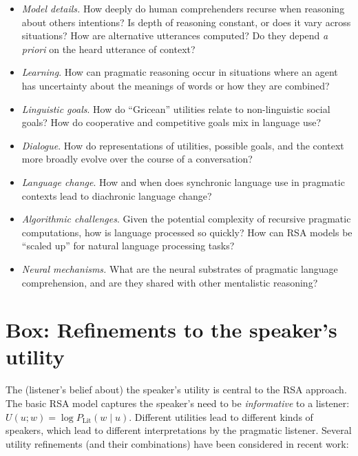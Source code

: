\documentclass[]{elsarticle}
\begin{document}
\begin{itemize}
\item \emph{Model details.} How deeply do human comprehenders recurse when
  reasoning about others intentions? Is depth of reasoning constant, or
  does it vary across situations? How are alternative utterances
  computed? Do they depend \emph{a priori} on the heard utterance of
  context?

\item \emph{Learning}. How can pragmatic reasoning occur in situations where
  an agent has uncertainty about the meanings of words or how they are
  combined?

\item \emph{Linguistic goals}. How do ``Gricean'' utilities relate to non-linguistic social goals? How do cooperative and competitive goals mix in language use?

\item \emph{Dialogue}. How do representations of utilities, possible goals,
  and the context more broadly evolve over the course of a conversation?

\item \emph{Language change}. How and when does synchronic language use in
  pragmatic contexts lead to diachronic language change?

\item \emph{Algorithmic challenges}. Given the potential complexity of
  recursive pragmatic computations, how is language processed so
  quickly? How can RSA models be ``scaled up'' for natural language
  processing tasks?

\item \emph{Neural mechanisms.} What are the neural substrates of pragmatic
  language comprehension, and are they shared with other mentalistic
  reasoning?

\end{itemize}

\section{Box: Refinements to the speaker's utility}\label{box-refinements-to-the-speakers-utility}

The (listener's belief about) the speaker's utility is central to the
RSA approach. The basic RSA model captures the speaker's need to be
\emph{informative} to a listener: $U(u; w) = \log
P_{\text{Lit}}(w\mid u)$. Different utilities lead to different kinds of
speakers, which lead to different interpretations by the pragmatic
listener. Several utility refinements (and their combinations) have been
considered in recent work:
\end{document}
